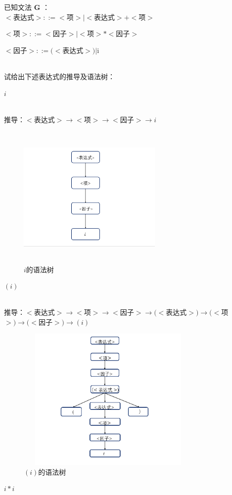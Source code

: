 \documentclass{cisXXX} %
\begin{document}
\begin{CJK}{UTF8}{gbsn}
\maketitle


\HWproblem
已知文法 \textbf{G} ：
~\\

$<$表达式$>::=<$项$>|<$表达式$>+<$项$>$

$<$项$>::=<$因子$>|<$项$>*<$因子$>$

$<$因子$>::=(<$表达式$>)|$i

~\\
试给出下述表达式的推导及语法树：

\HWsubproblem 
$i$

~\\推导：$<$表达式$>\rightarrow <$项$> \rightarrow <$因子$>\rightarrow i$
\begin{figure}[ht]
	\centering
	\includegraphics[width=7cm,height=7cm]{1_1.png}
	\caption{$i$的语法树}
	\label{fig:label}
\end{figure}    

\HWsubproblem 
$(i)$

~\\推导：$<$表达式$>\rightarrow <$项$>\rightarrow <$因子$>\rightarrow (<$表达式$>)\rightarrow (<$项$>) \rightarrow (<$因子$>)\rightarrow (i)$
\begin{figure}[ht]
	\centering
	\includegraphics[width=9cm,height=7cm]{1_2.png}
	\caption{$(i)$的语法树}
	\label{fig:label}
\end{figure}    
\HWsubproblem 
$i*i$


\end{CJK}
\end{document}
